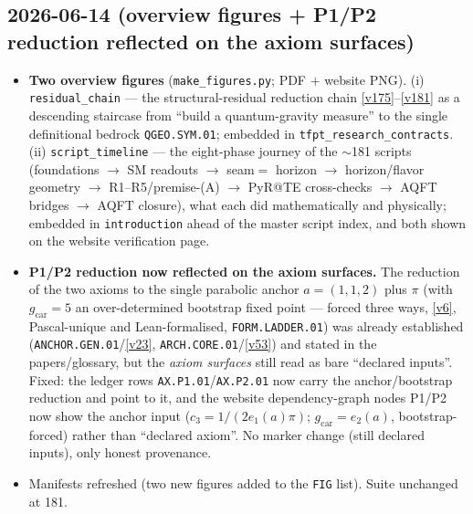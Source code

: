 \subsection*{2026-06-14 (overview figures + P1/P2 reduction reflected on the axiom surfaces)}
\begin{itemize}
\item \textbf{Two overview figures} (\texttt{make\_figures.py}; PDF $+$ website PNG). (i)
  \texttt{residual\_chain} --- the structural-residual reduction chain \vref{v175}--\vref{v181} as a
  descending staircase from ``build a quantum-gravity measure'' to the single definitional bedrock
  \texttt{QGEO.SYM.01}; embedded in \texttt{tfpt\_research\_contracts}. (ii) \texttt{script\_timeline}
  --- the eight-phase journey of the $\sim$181 scripts (foundations $\to$ SM readouts $\to$ seam$=$
  horizon $\to$ horizon/flavor geometry $\to$ R1--R5/premise-(A) $\to$ PyR@TE cross-checks $\to$ AQFT
  bridges $\to$ AQFT closure), what each did mathematically and physically; embedded in
  \texttt{introduction} ahead of the master script index, and both shown on the website verification page.
\item \textbf{P1/P2 reduction now reflected on the axiom surfaces.} The reduction of the two axioms to
  the single parabolic anchor $a=(1,1,2)$ plus $\pi$ (with $g_{\mathrm{car}}=5$ an over-determined
  bootstrap fixed point --- forced three ways, \vref{v6}, Pascal-unique and Lean-formalised,
  \texttt{FORM.LADDER.01}) was already established (\texttt{ANCHOR.GEN.01}/\vref{v23},
  \texttt{ARCH.CORE.01}/\vref{v53}) and stated in the papers/glossary, but the \emph{axiom surfaces}
  still read as bare ``declared inputs''. Fixed: the ledger rows \texttt{AX.P1.01}/\texttt{AX.P2.01} now
  carry the anchor/bootstrap reduction and point to it, and the website dependency-graph nodes P1/P2 now
  show the anchor input ($c_3=1/(2e_1(a)\pi)$; $g_{\mathrm{car}}=e_2(a)$, bootstrap-forced) rather than
  ``declared axiom''. No marker change (still declared inputs), only honest provenance.
\item Manifests refreshed (two new figures added to the \texttt{FIG} list). Suite unchanged at 181.
\end{itemize}

